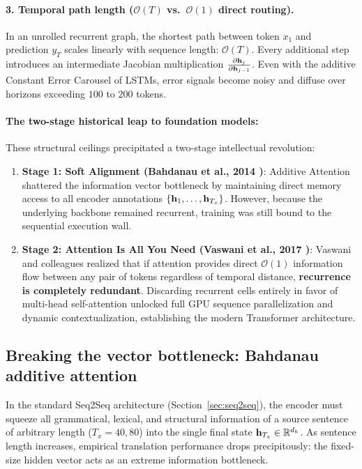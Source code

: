 \documentclass[../../main.tex]{subfiles}
\begin{document}
\paragraph{3. Temporal path length ($\mathcal{O}(T)$ vs.~$\mathcal{O}(1)$ direct routing).}
In an unrolled recurrent graph, the shortest path between token $x_1$ and prediction $y_T$ scales linearly with sequence length: $\mathcal{O}(T)$. Every additional step introduces an intermediate Jacobian multiplication $\frac{\partial \mathbf{h}_j}{\partial \mathbf{h}_{j-1}}$. Even with the additive Constant Error Carousel of LSTMs, error signals become noisy and diffuse over horizons exceeding $100$ to $200$ tokens.

\paragraph{The two-stage historical leap to foundation models:}
These structural ceilings precipitated a two-stage intellectual revolution:
\begin{enumerate}
    \item \textbf{Stage 1: Soft Alignment (Bahdanau et al., 2014 \cite{bahdanau2014})}: Additive Attention shattered the information vector bottleneck by maintaining direct memory access to all encoder annotations $\{\mathbf{h}_1, \dots, \mathbf{h}_{T_x}\}$. However, because the underlying backbone remained recurrent, training was still bound to the sequential execution wall.
    \item \textbf{Stage 2: Attention Is All You Need (Vaswani et al., 2017 \cite{vaswani2017})}: Vaswani and colleagues realized that if attention provides direct $\mathcal{O}(1)$ information flow between any pair of tokens regardless of temporal distance, \textbf{recurrence is completely redundant}. Discarding recurrent cells entirely in favor of multi-head self-attention unlocked full GPU sequence parallelization and dynamic contextualization, establishing the modern Transformer architecture.
\end{enumerate}

\subsection{Breaking the vector bottleneck: Bahdanau additive attention}
\label{sec:bahdanau_attention}

In the standard Seq2Seq architecture (Section~\ref{sec:seq2seq}), the encoder must squeeze all grammatical, lexical, and structural information of a source sentence of arbitrary length ($T_x = 40, 80$) into the single final state $\mathbf{h}_{T_x} \in \mathbb{R}^{d_h}$. As sentence length increases, empirical translation performance drops precipitously: the fixed-size hidden vector acts as an extreme information bottleneck.
\end{document}
